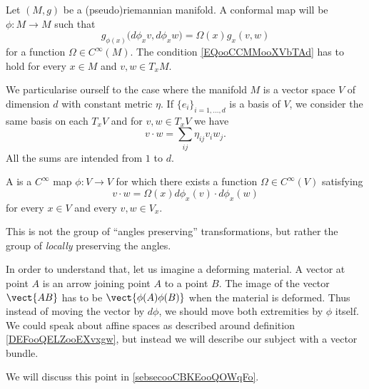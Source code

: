 \begin{definition}
Let \( (M,g)\) be a (pseudo)riemannian manifold. A conformal map will be \( \phi\colon M\to M\) such that
\begin{equation}        \label{EQooCCMMooXVbTAd}
    g_{\phi(x)}\big( d\phi_xv,d\phi_xw \big)=\Omega(x)g_x(v,w)
\end{equation}
for a function \( \Omega\in C^{\infty}(M)\). The condition \eqref{EQooCCMMooXVbTAd} has to hold for every \( x\in M\) and \( v,w\in T_xM\).
\end{definition}

We particularise ourself to the case where the manifold \( M\) is a vector space \( V\) of dimension \( d\) with constant metric \( \eta\). If \( \{ e_i \}_{i=1,\ldots, d}\) is a basis of \( V\), we consider the same basis on each \( T_xV\) and for \( v,w\in T_xV\) we have
\begin{equation}
    v\cdot w=\sum_{ij}\eta_{ij}v_iw_j.
\end{equation}
All the sums are intended from \( 1\) to \( d\).

\begin{definition}      \label{DEFooVKNBooFBWQQM}
    A  is a \(  C^{\infty}\) map \( \phi\colon V\to V\) for which there exists a function \( \Omega\in C^{\infty}(V)\) satisfying
    \begin{equation}        \label{EQooOZDUooCDaIrh}
        v\cdot w=\Omega(x) d\phi_x(v)\cdot d\phi_x(w)
    \end{equation}
    for every \( x\in V\) and every \( v,w\in V_x\).
\end{definition}
    

\begin{normaltext}  \label{NorooVEVOooRBpvXF}
    This is not the group of ``angles preserving'' transformations, but rather the group of \emph{locally} preserving the angles.

In order to understand that, let us imagine a deforming material. A vector at point \( A\) is an arrow joining point \( A\) to a point \( B\). The image of the vector \( \vect{ AB }\) has to be \( \vect{ \phi(A)\phi(B) }\) when the material is deformed. Thus instead of moving the vector by \( d\phi\), we should move both extremities by \( \phi\) itself. We could speak about affine spaces as described around definition \ref{DEFooQELZooEXvxgw}, but instead we will describe our subject with a vector bundle.

We will discuss this point in \ref{sebsecooCBKEooQOWqFo}.
\end{normaltext}

